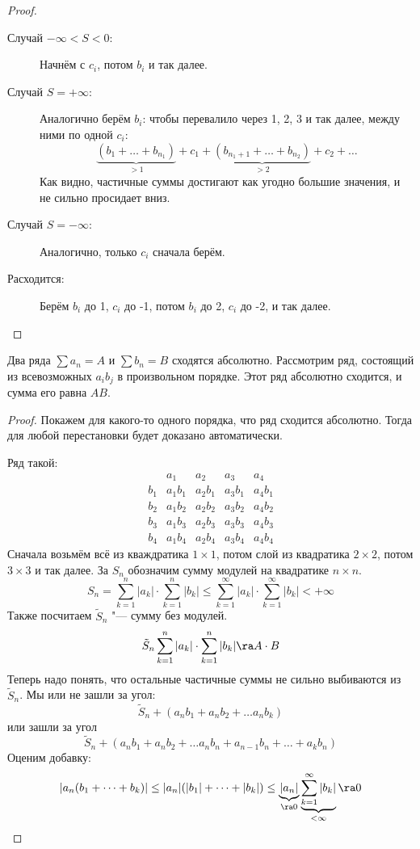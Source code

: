 \begin{proof}
\begin{description}
	\item[Случай $-\infty < S < 0$:]
		Начнём с $c_i$, потом $b_i$ и так далее.

	\item[Случай $S = +\infty$:]
		Аналогично берём $b_i$: чтобы перевалило через 1, 2, 3 и так далее, между ними по одной $c_i$:
		\[ \underbrace{(b_1 + \dots + b_{n_1})}_{> 1} + c_1 + \underbrace{(b_{n_1 + 1} + \dots + b_{n_2})}_{> 2} + c_2 + \dots \]
		Как видно, частичные суммы достигают как угодно большие значения, и не сильно просидает вниз.

	\item[Случай $S = -\infty$:]
		Аналогично, только $c_i$ сначала берём.

	\item[Расходится:]
		Берём $b_i$ до 1, $c_i$ до -1, потом $b_i$ до 2, $c_i$ до -2, и так далее.
	\end{description}
\end{proof}

\begin{theorem}[Коши]
	Два ряда $\sum a_n = A$ и $\sum b_n = B$ сходятся абсолютно.
	Рассмотрим ряд, состоящий из всевозможных $a_ib_j$ в произвольном порядке.
	Этот ряд абсолютно сходится, и сумма его равна $AB$.
\end{theorem}
\begin{proof}
	Покажем для какого-то одного порядка, что ряд сходится абсолютно.
	Тогда для любой перестановки будет доказано автоматически.

	Ряд такой:
	\[\begin{array}{ccccc}
		    & a_1    & a_2    & a_3    & a_4    \\
		b_1 & a_1b_1 & a_2b_1 & a_3b_1 & a_4b_1 \\
		b_2 & a_1b_2 & a_2b_2 & a_3b_2 & a_4b_2 \\
		b_3 & a_1b_3 & a_2b_3 & a_3b_3 & a_4b_3 \\
		b_4 & a_1b_4 & a_2b_4 & a_3b_4 & a_4b_4
	\end{array}\]
	Сначала возьмём всё из кваждратика $1 \times 1$, потом слой из квадратика $2 \times 2$, потом $3 \times 3$ и так далее.
	За $S_n$ обозначим сумму модулей на квадратике $n \times n$.
	\[ S_n = \sum_{k=1}^n |a_k| \cdot \sum_{k=1}^n |b_k| \le \sum_{k=1}^\infty |a_k| \cdot \sum_{k=1}^\infty |b_k| < +\infty \]
	Также посчитаем $\tilde S_n$ "--- сумму без модулей.
	\[ \tilde S_n \sum_{k=1}^n |a_k| \cdot \sum_{k=1}^n |b_k| \ra A \cdot B \]
	Теперь надо понять, что остальные частичные суммы не сильно выбиваются из $\tilde S_n$.
	Мы или не зашли за угол:
	\[ \tilde S_n + (a_nb_1 + a_nb_2 + \dots a_nb_k) \]
	или зашли за угол
	\[ \tilde S_n + (a_nb_1 + a_nb_2 + \dots a_nb_n + a_{n-1}b_n + \dots + a_kb_n) \]
	Оценим добавку:
	\[
		|a_n(b_1 + \dots + b_k)| 
		\le |a_n| (|b_1| + \dots + |b_k|)
		\le \underbrace{|a_n|}_{\ra 0} \underbrace{\sum_{k=1}^\infty |b_k|}_{<\infty} \ra 0
	\]
\end{proof}

